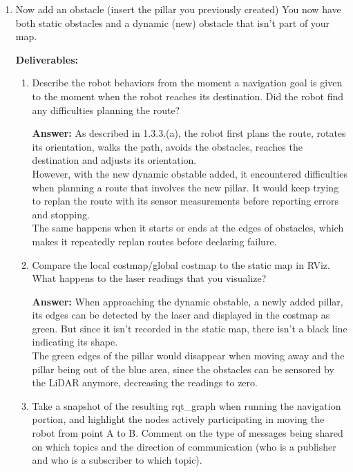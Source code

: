 \documentclass[12pt]{article}
\begin{document}
\begin{enumerate}
    
    \item Now add an obstacle (insert the pillar you previously created)
    You now have both static obstacles and a dynamic (new) obstacle that isn’t part of your map. 
    
    \textbf{Deliverables:}
    \begin{enumerate}
        \item Describe the robot behaviors from the moment a navigation goal is given to the moment when the robot reaches its destination. Did the robot find any difficulties planning the route?
        
        \textbf{Answer: }As described in 1.3.3.(a), the robot first plans the route, rotates its orientation, walks the path, avoids the obstacles, reaches the destination and adjusts its orientation.
        \\However, with the new dynamic obstable added, it encountered difficulties when planning a route that involves the new pillar. It would keep trying to replan the route with its sensor measurements before reporting errors and stopping.
        \\The same happens when it starts or ends at the edges of obstacles, which makes it repeatedly replan routes before declaring failure.

        \item Compare the local costmap/global costmap to the static map in RViz. What happens to the laser readings that you visualize?
        
        \textbf{Answer: }When approaching the dynamic obstable, a newly added pillar, its edges can be detected by the laser and displayed in the costmap as green. But since it isn't recorded in the static map, there isn't a black line indicating its shape.
        \\The green edges of the pillar would disappear when moving away and the pillar being out of the blue area, since the obstacles can be sensored by the LiDAR anymore, decreasing the readings to zero.
        
        \item Take a snapshot of the resulting rqt\_graph when running the navigation portion, and highlight the nodes actively participating in moving the robot from point A to B. Comment on the type of messages being shared on which topics and the direction of communication (who is a publisher and who is a subscriber to which topic).
        

\end{enumerate}
\end{enumerate}
\end{document}
